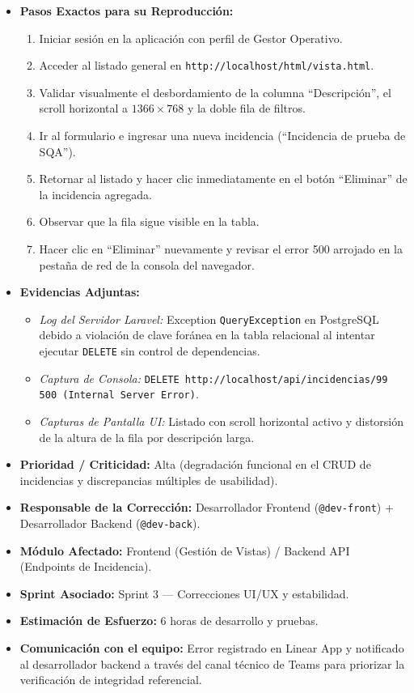 \begin{itemize}
    \item \textbf{Pasos Exactos para su Reproducción:}
    \begin{enumerate}
        \item Iniciar sesión en la aplicación con perfil de Gestor Operativo.
        \item Acceder al listado general en \texttt{http://localhost/html/vista.html}.
        \item Validar visualmente el desbordamiento de la columna ``Descripción'', el scroll horizontal a $1366\times768$ y la doble fila de filtros.
        \item Ir al formulario e ingresar una nueva incidencia (``Incidencia de prueba de SQA'').
        \item Retornar al listado y hacer clic inmediatamente en el botón ``Eliminar'' de la incidencia agregada.
        \item Observar que la fila sigue visible en la tabla.
        \item Hacer clic en ``Eliminar'' nuevamente y revisar el error 500 arrojado en la pestaña de red de la consola del navegador.
    \end{enumerate}
    
    \item \textbf{Evidencias Adjuntas:}
    \begin{itemize}
        \item \textit{Log del Servidor Laravel:} Exception \texttt{QueryException} en PostgreSQL debido a violación de clave foránea en la tabla relacional al intentar ejecutar \texttt{DELETE} sin control de dependencias.
        \item \textit{Captura de Consola:} \texttt{DELETE http://localhost/api/incidencias/99 500 (Internal Server Error)}.
        \item \textit{Capturas de Pantalla UI:} Listado con scroll horizontal activo y distorsión de la altura de la fila por descripción larga.
    \end{itemize}
    \item \textbf{Prioridad / Criticidad:} Alta (degradación funcional en el CRUD de incidencias y discrepancias múltiples de usabilidad).
    \item \textbf{Responsable de la Corrección:} Desarrollador Frontend (\texttt{@dev-front}) + Desarrollador Backend (\texttt{@dev-back}).
    \item \textbf{Módulo Afectado:} Frontend (Gestión de Vistas) / Backend API (Endpoints de Incidencia).
    \item \textbf{Sprint Asociado:} Sprint 3 --- Correcciones UI/UX y estabilidad.
    \item \textbf{Estimación de Esfuerzo:} 6 horas de desarrollo y pruebas.
    \item \textbf{Comunicación con el equipo:} Error registrado en Linear App y notificado al desarrollador backend a través del canal técnico de Teams para priorizar la verificación de integridad referencial.
\end{itemize}